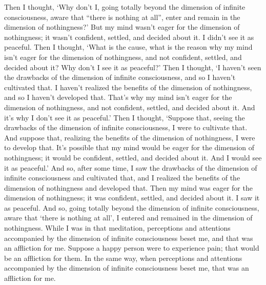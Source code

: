 \documentclass[12pt,openany]{book}%
\begin{document}
Then I thought, ‘Why don’t I, going totally beyond the dimension of infinite consciousness, aware that “there is nothing at all”, enter and remain in the dimension of nothingness?’ But my mind wasn’t eager for the dimension of nothingness; it wasn’t confident, settled, and decided about it. I didn’t see it as peaceful. Then I thought, ‘What is the cause, what is the reason why my mind isn’t eager for the dimension of nothingness, and not confident, settled, and decided about it? Why don’t I see it as peaceful?’ Then I thought, ‘I haven’t seen the drawbacks of the dimension of infinite consciousness, and so I haven’t cultivated that. I haven’t realized the benefits of the dimension of nothingness, and so I haven’t developed that. That’s why my mind isn’t eager for the dimension of nothingness, and not confident, settled, and decided about it. And it’s why I don’t see it as peaceful.’ Then I thought, ‘Suppose that, seeing the drawbacks of the dimension of infinite consciousness, I were to cultivate that. And suppose that, realizing the benefits of the dimension of nothingness, I were to develop that. It’s possible that my mind would be eager for the dimension of nothingness; it would be confident, settled, and decided about it. And I would see it as peaceful.’ And so, after some time, I saw the drawbacks of the dimension of infinite consciousness and cultivated that, and I realized the benefits of the dimension of nothingness and developed that. Then my mind was eager for the dimension of nothingness; it was confident, settled, and decided about it. I saw it as peaceful. And so, going totally beyond the dimension of infinite consciousness, aware that ‘there is nothing at all’, I entered and remained in the dimension of nothingness. While I was in that meditation, perceptions and attentions accompanied by the dimension of infinite consciousness beset me, and that was an affliction for me. Suppose a happy person were to experience pain; that would be an affliction for them. In the same way, when perceptions and attentions accompanied by the dimension of infinite consciousness beset me, that was an affliction for me. 
\end{document}
